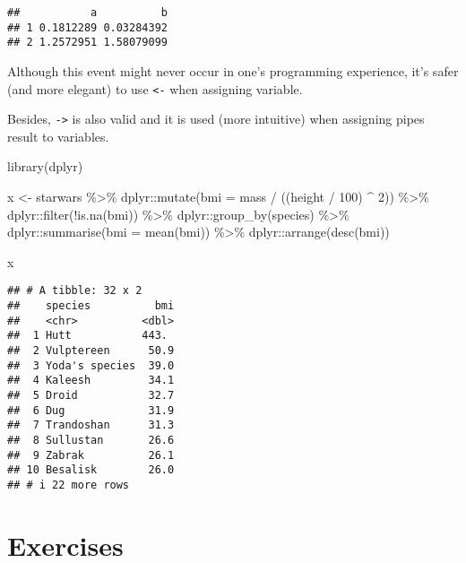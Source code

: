 \documentclass[
  oneside]{book}
\newenvironment{Shaded}{\begin{snugshade}}{\end{snugshade}}
\newcommand{\AttributeTok}[1]{\textcolor[rgb]{0.77,0.63,0.00}{#1}}
\newcommand{\DecValTok}[1]{\textcolor[rgb]{0.00,0.00,0.81}{#1}}
\newcommand{\FunctionTok}[1]{\textcolor[rgb]{0.00,0.00,0.00}{#1}}
\newcommand{\NormalTok}[1]{#1}
\newcommand{\OtherTok}[1]{\textcolor[rgb]{0.56,0.35,0.01}{#1}}
\newcommand{\SpecialCharTok}[1]{\textcolor[rgb]{0.00,0.00,0.00}{#1}}
\begin{document}
\begin{verbatim}
##           a          b
## 1 0.1812289 0.03284392
## 2 1.2572951 1.58079099
\end{verbatim}

Although this event might never occur in one's programming experience, it's
safer (and more elegant) to use \texttt{\textless{}-} when assigning variable.

Besides, \texttt{-\textgreater{}} is also valid and it is used (more intuitive) when assigning pipes
result to variables.

\begin{Shaded}
\begin{Highlighting}[]
\FunctionTok{library}\NormalTok{(dplyr)}

\NormalTok{x }\OtherTok{\textless{}{-}}\NormalTok{ starwars }\SpecialCharTok{\%\textgreater{}\%}
\NormalTok{  dplyr}\SpecialCharTok{::}\FunctionTok{mutate}\NormalTok{(}\AttributeTok{bmi =}\NormalTok{ mass }\SpecialCharTok{/}\NormalTok{ ((height }\SpecialCharTok{/} \DecValTok{100}\NormalTok{) }\SpecialCharTok{\^{}} \DecValTok{2}\NormalTok{)) }\SpecialCharTok{\%\textgreater{}\%}
\NormalTok{  dplyr}\SpecialCharTok{::}\FunctionTok{filter}\NormalTok{(}\SpecialCharTok{!}\FunctionTok{is.na}\NormalTok{(bmi)) }\SpecialCharTok{\%\textgreater{}\%}
\NormalTok{  dplyr}\SpecialCharTok{::}\FunctionTok{group\_by}\NormalTok{(species) }\SpecialCharTok{\%\textgreater{}\%}
\NormalTok{  dplyr}\SpecialCharTok{::}\FunctionTok{summarise}\NormalTok{(}\AttributeTok{bmi =} \FunctionTok{mean}\NormalTok{(bmi)) }\SpecialCharTok{\%\textgreater{}\%}
\NormalTok{  dplyr}\SpecialCharTok{::}\FunctionTok{arrange}\NormalTok{(}\FunctionTok{desc}\NormalTok{(bmi))}

\NormalTok{x}
\end{Highlighting}
\end{Shaded}

\begin{verbatim}
## # A tibble: 32 x 2
##    species          bmi
##    <chr>          <dbl>
##  1 Hutt           443. 
##  2 Vulptereen      50.9
##  3 Yoda's species  39.0
##  4 Kaleesh         34.1
##  5 Droid           32.7
##  6 Dug             31.9
##  7 Trandoshan      31.3
##  8 Sullustan       26.6
##  9 Zabrak          26.1
## 10 Besalisk        26.0
## # i 22 more rows
\end{verbatim}

\hypertarget{exercises}{%
\section{Exercises}\label{exercises}}
\end{document}
